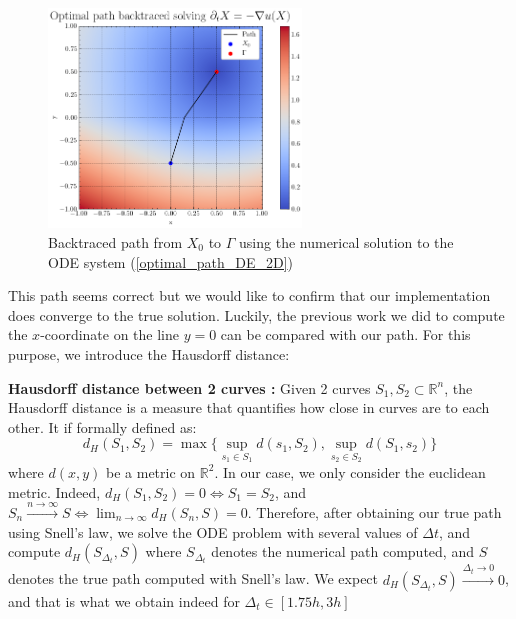 \documentclass[11pt]{article}
\theoremstyle{definition}
\theoremstyle{remark}
\newcommand{\R}{\mathbb{R}}
\begin{document}
\begin{figure}[h]
  \centering
  \includegraphics[width=0.6\textwidth]{plots/snell_path.png}
  \caption{Backtraced path from $X_0$ to $\Gamma$ using the numerical solution to the ODE system (\ref{optimal_path_DE_2D})}
  \label{fig:snell_path}
\end{figure}

\noindent This path seems correct but we would like to confirm that our implementation does converge to the true solution. Luckily, the previous work we did to compute the $x$-coordinate on the line $y=0$ can be compared with our path. For this purpose, we introduce the Hausdorff distance: \\

\vspace{5pt}

\noindent\textbf{Hausdorff distance between 2 curves :} Given 2 curves $S_1,S_2\subset \mathbb{R}^n$, the Hausdorff distance is a measure that quantifies how close in curves are to each other. It if formally defined as:
\begin{equation*}
    d_H(S_1,S_2)=\max\{\sup_{s_1\in S_1}d(s_1,S_2),\sup_{s_2\in S_2}d(S_1,s_2)\}
\end{equation*}
where $d(x,y)$ be a metric on $\R^2$. In our case, we only consider the euclidean metric. Indeed, $d_H(S_1,S_2)=0\iff S_1=S_2$, and $S_n\xrightarrow{n\to\infty}S\iff\lim_{n\to\infty}d_H(S_n,S)=0$.
Therefore, after obtaining our true path using Snell's law, we solve the ODE problem with several values of $\Delta t$, and compute $d_H(S_{\Delta_t},S)$ where $S_{\Delta_t}$ denotes the numerical path computed, and $S$ denotes the true path computed with Snell's law. We expect $d_H(S_{\Delta_t},S)\xrightarrow{\Delta_t\to0}0$, and that is what we obtain indeed for $\Delta_t\in[1.75h,3h]$ \\
\end{document}
